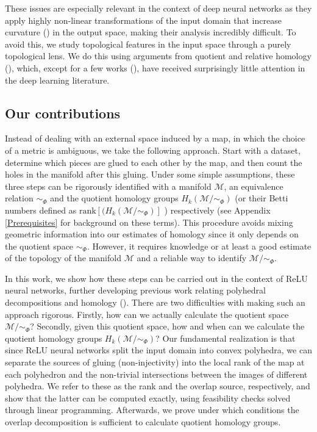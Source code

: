 \documentclass[10pt]{article} %
\theoremstyle{plain}
\theoremstyle{definition}
\theoremstyle{remark}
\begin{document}
These issues are especially relevant in the context of deep neural networks as they apply highly non-linear transformations of the input domain that increase curvature (\cite{poole2016exponential}) in the output space, making their analysis incredibly difficult. To avoid this, we study topological features in the input space through a purely topological lens. We do this using arguments from quotient and relative homology (\cite{hatcher2005algebraic}), which, except for a few works (\cite{pokorny2016topological, blaser2022relative, beshkov2024rank}), have received surprisingly little attention in the deep learning literature.

\subsection{Our contributions}
Instead of dealing with an external space induced by a map, in which the choice of a metric is ambiguous, we take the following approach. Start with a dataset, determine which pieces are glued to each other by the map, and then count the holes in the manifold after this gluing. Under some simple assumptions, these three steps can be rigorously identified with a manifold $\mathcal{M}$, an equivalence relation $\sim_\Phi$ and the quotient homology groups $H_k(\mathcal{M}/\sim_\Phi)$ ({or their Betti numbers defined as $\text{rank}[(H_k(\mathcal{M}/\sim_\Phi)]$} ) respectively  (see Appendix \ref{Prerequisites} for background on these terms). This procedure avoids mixing geometric information into our estimates of homology since it only depends on the quotient space $\sim_\Phi$. However, it requires knowledge or at least a good estimate of the topology of the manifold $\mathcal{M}$ and a reliable way to identify $\mathcal{M}/\sim_\Phi$.

In this work, we show how these steps can be carried out in the context of ReLU neural networks, further developing previous work relating polyhedral decompositions and homology (\cite{liu2023relu}). There are two difficulties with making such an approach rigorous. Firstly, how can we actually calculate the quotient space $\mathcal{M}/\sim_\Phi$? Secondly, given this quotient space, how and when can we calculate the quotient homology groups $H_k(\mathcal{M}/\sim_\Phi)$? Our fundamental realization is that since ReLU neural networks split the input domain into convex polyhedra, we can separate the sources of gluing (non-injectivity) into the local rank of the map at each polyhedron and the non-trivial intersections between the images of different polyhedra. We refer to these as the rank and the overlap source, respectively, and show that the latter can be computed exactly, using feasibility checks solved through linear programming. Afterwards, we prove under which conditions the overlap decomposition is sufficient to calculate quotient homology groups.
\end{document}

